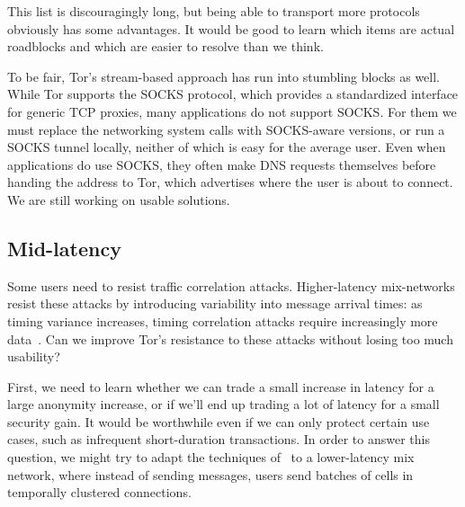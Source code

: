 \documentclass{llncs}
\begin{document}
This list is discouragingly long, but being able to transport more
protocols obviously has some advantages. It would be good to learn which
items are actual roadblocks and which are easier to resolve than we think.

To be fair, Tor's stream-based approach has run into
stumbling blocks as well. While Tor supports the SOCKS protocol,
which provides a standardized interface for generic TCP proxies, many
applications do not support SOCKS\@. For them we must
replace the networking system calls with SOCKS-aware
versions, or run a SOCKS tunnel locally, neither of which is
easy for the average user. %
Even when applications do use SOCKS, they often make DNS requests
themselves before handing the address to Tor, which advertises
where the user is about to connect.
We are still working on usable solutions.


\subsection{Mid-latency}
\label{subsec:mid-latency}

Some users need to resist traffic correlation attacks.  Higher-latency
mix-networks resist these attacks by introducing variability into message
arrival times: as timing variance increases, timing correlation attacks
require increasingly more data~\cite{e2e-traffic}. Can we improve Tor's
resistance to these attacks without losing too much usability?

First, we need to learn whether we can trade a small increase in latency
for a large anonymity increase, or if we'll end up trading a lot of
latency for a small security gain. It would be worthwhile even if we
can only protect certain use cases, such as infrequent short-duration
transactions.  In order to answer this question, we might
try to adapt the techniques of~\cite{e2e-traffic} to a lower-latency mix
network, where instead of sending messages, users send batches
of cells in temporally clustered connections.
\end{document}
